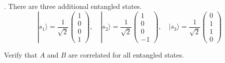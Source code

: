 . There are three additional entangled states.
\begin{equation*}
|s_1\rangle=\frac{1}{\sqrt2}\begin{pmatrix}1\\0\\0\\1\end{pmatrix},\quad
|s_2\rangle=\frac{1}{\sqrt2}\begin{pmatrix}1\\0\\0\\-1\end{pmatrix},\quad
|s_3\rangle=\frac{1}{\sqrt2}\begin{pmatrix}0\\1\\1\\0\end{pmatrix}
\end{equation*}

Verify that $A$ and $B$ are correlated for all entangled states.


